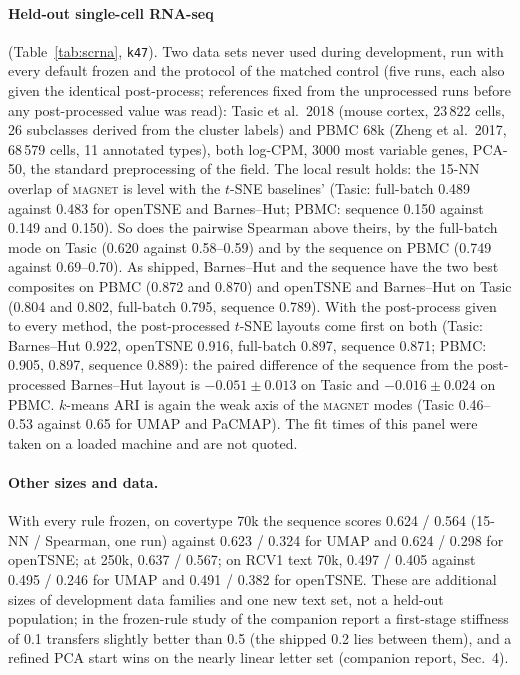 \documentclass[10pt,twocolumn]{article}
\newcommand{\magnet}{\textsc{magnet}}
\newcommand{\knn}{15-NN}
\begin{document}
\paragraph{Held-out single-cell RNA-seq} (Table~\ref{tab:scrna}, \texttt{k47}). Two data sets never used during
development, run with every default frozen and the protocol of the matched control (five runs, each also given the
identical post-process; references fixed from the unprocessed runs before any post-processed value was read):
Tasic et al.\ 2018 (mouse cortex, 23\,822 cells, 26 subclasses derived from the cluster labels) and PBMC 68k (Zheng
et al.\ 2017, 68\,579 cells, 11 annotated types), both log-CPM, 3000 most variable genes, PCA-50, the standard
preprocessing of the field. The local result holds: the 15-NN overlap of \magnet{} is level with the $t$-SNE
baselines' (Tasic: full-batch 0.489 against 0.483 for openTSNE and Barnes--Hut; PBMC: sequence 0.150 against 0.149
and 0.150). So does the pairwise Spearman above theirs, by the full-batch mode on Tasic (0.620 against 0.58--0.59)
and by the sequence on PBMC (0.749 against 0.69--0.70). As shipped, Barnes--Hut and the sequence have the two best
composites on PBMC (0.872 and 0.870) and openTSNE and Barnes--Hut on Tasic (0.804 and 0.802, full-batch 0.795, sequence 0.789).
With the post-process given to every method, the post-processed $t$-SNE layouts come first on both (Tasic:
Barnes--Hut 0.922, openTSNE 0.916, full-batch 0.897, sequence 0.871; PBMC: 0.905, 0.897, sequence 0.889): the
paired difference of the sequence from the post-processed Barnes--Hut layout is $-0.051 \pm 0.013$ on Tasic and
$-0.016 \pm 0.024$ on PBMC. $k$-means ARI is again the weak axis of the \magnet{} modes (Tasic 0.46--0.53 against
0.65 for UMAP and PaCMAP). The fit times of this panel were taken on a loaded machine and are not quoted.

\paragraph{Other sizes and data.} With every rule frozen, on covertype 70k the sequence scores 0.624 / 0.564
(\knn{} / Spearman, one run) against 0.623 / 0.324 for UMAP and 0.624 / 0.298 for openTSNE; at 250k, 0.637 / 0.567; on RCV1
text 70k, 0.497 / 0.405 against 0.495 / 0.246 for UMAP and 0.491 / 0.382 for openTSNE. These are additional sizes
of development data families and one new text set, not a held-out population; in the frozen-rule study of the companion report a first-stage
stiffness of 0.1 transfers slightly better than 0.5 (the shipped 0.2 lies between them), and a refined PCA start wins on the nearly linear letter set
(companion report, Sec.~4).
\end{document}
